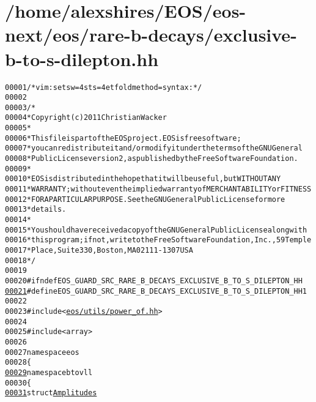 \hypertarget{exclusive-b-to-s-dilepton_8hh_source}{
\section{/home/alexshires/EOS/eos-\/next/eos/rare-\/b-\/decays/exclusive-\/b-\/to-\/s-\/dilepton.hh}
}


\begin{footnotesize}\begin{alltt}
00001 \textcolor{comment}{/* vim: set sw=4 sts=4 et foldmethod=syntax : */}
00002 
00003 \textcolor{comment}{/*}
00004 \textcolor{comment}{ * Copyright (c) 2011 Christian Wacker}
00005 \textcolor{comment}{ *}
00006 \textcolor{comment}{ * This file is part of the EOS project. EOS is free software;}
00007 \textcolor{comment}{ * you can redistribute it and/or modify it under the terms of the GNU General}
00008 \textcolor{comment}{ * Public License version 2, as published by the Free Software Foundation.}
00009 \textcolor{comment}{ *}
00010 \textcolor{comment}{ * EOS is distributed in the hope that it will be useful, but WITHOUT ANY}
00011 \textcolor{comment}{ * WARRANTY; without even the implied warranty of MERCHANTABILITY or FITNESS}
00012 \textcolor{comment}{ * FOR A PARTICULAR PURPOSE.  See the GNU General Public License for more}
00013 \textcolor{comment}{ * details.}
00014 \textcolor{comment}{ *}
00015 \textcolor{comment}{ * You should have received a copy of the GNU General Public License along with}
00016 \textcolor{comment}{ * this program; if not, write to the Free Software Foundation, Inc., 59 Temple}
00017 \textcolor{comment}{ * Place, Suite 330, Boston, MA  02111-1307  USA}
00018 \textcolor{comment}{ */}
00019 
00020 \textcolor{preprocessor}{#ifndef EOS\_GUARD\_SRC\_RARE\_B\_DECAYS\_EXCLUSIVE\_B\_TO\_S\_DILEPTON\_HH}
\hypertarget{exclusive-b-to-s-dilepton_8hh_source_l00021}{}\hyperlink{exclusive-b-to-s-dilepton_8hh_abc2ad3337a546fab596884c2f5e8ffa6}{00021} \textcolor{preprocessor}{}\textcolor{preprocessor}{#define EOS\_GUARD\_SRC\_RARE\_B\_DECAYS\_EXCLUSIVE\_B\_TO\_S\_DILEPTON\_HH 1}
00022 \textcolor{preprocessor}{}
00023 \textcolor{preprocessor}{#include <\hyperlink{power__of_8hh}{eos/utils/power_of.hh}>}
00024 
00025 \textcolor{preprocessor}{#include <array>}
00026 
00027 \textcolor{keyword}{namespace }eos
00028 \{
\hypertarget{exclusive-b-to-s-dilepton_8hh_source_l00029}{}\hyperlink{namespaceeos_1_1btovll}{00029}     \textcolor{keyword}{namespace }btovll
00030     \{
\hypertarget{exclusive-b-to-s-dilepton_8hh_source_l00031}{}\hyperlink{structeos_1_1btovll_1_1Amplitudes}{00031}         \textcolor{keyword}{struct }\hyperlink{structeos_1_1btovll_1_1Amplitudes}{Amplitudes}

\end{alltt}
\end{footnotesize}
